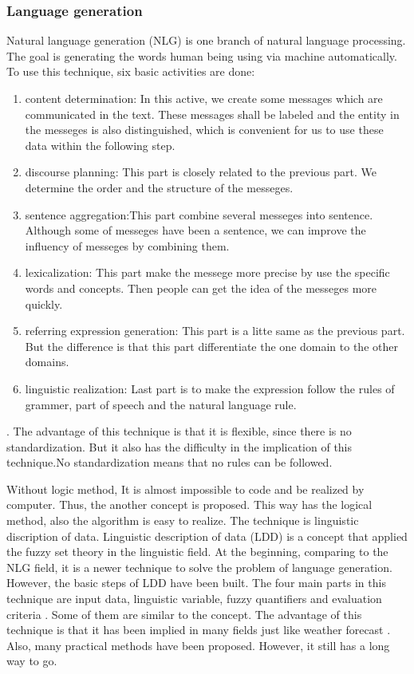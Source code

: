 \subsubsection*{Language generation}

Natural language generation (NLG) is one branch of natural language processing. 
The goal is generating the words human being using via machine automatically. 
To use this technique, six basic activities are done: 
\begin{enumerate}
	\item content determination: In this active, we create some messages which are communicated in the text. 
	These messages shall be labeled and the entity in the messeges is also distinguished, which is convenient for us to 
	use these data within the following step.
	\item discourse planning: This part is closely related to the previous part. 
	We determine the order and the structure of the messeges.
	\item sentence aggregation:This part combine several messeges into sentence. 
	Although some of messeges have been a sentence, we can improve the influency of messeges by combining them.
	\item lexicalization: This part make the messege more precise by use the specific words and concepts. 
	Then people can get the idea of the messeges more quickly.
	\item referring expression generation: This part is a litte same as the previous part. 
	But the difference is that this part differentiate the one domain to the other domains.
	\item linguistic realization: Last part is to make the expression follow the rules of grammer, part of speech and the natural language rule.
\end{enumerate}
\cite{aramossoto2016onthe}. 
The advantage of this technique is that it is flexible, since there is no standardization. 
But it also has the difficulty in the implication of this technique.\cite{aramossoto2016onthe}No standardization means that 
no rules can be followed. 

Without logic method, It is almost impossible to code and be realized by computer.
Thus, the another concept is proposed. This way has the logical method, also the algorithm is easy to realize.
The technique is linguistic discription of data.
Linguistic description of data (LDD) is a concept that applied the fuzzy set theory in the linguistic field. 
At the beginning, comparing to the NLG field, it is a newer technique to solve the problem of language generation. 
However, the basic steps of LDD have been built. 
The four main parts in this technique are input data, linguistic variable, fuzzy quantifiers and evaluation criteria \cite{aramossoto2016onthe}. 
Some of them are similar to the concept. 
The advantage of this technique is that it has been implied in many fields just like weather forecast \cite{Ramos-SotoBBT14}. 
Also, many practical methods have been proposed. 
However, it still has a long way to go.

